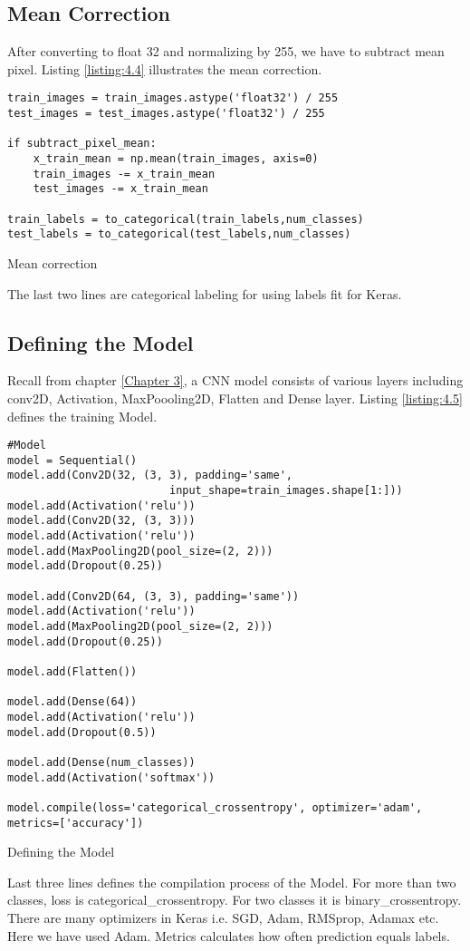 \subsection{Mean Correction}
After converting to float 32 and normalizing by 255, we have to subtract mean pixel.
Listing \ref{listing:4.4} illustrates the mean correction.

\begin{listing}[H]
    \begin{verbatim}
train_images = train_images.astype('float32') / 255
test_images = test_images.astype('float32') / 255

if subtract_pixel_mean:
    x_train_mean = np.mean(train_images, axis=0)
    train_images -= x_train_mean
    test_images -= x_train_mean

train_labels = to_categorical(train_labels,num_classes)
test_labels = to_categorical(test_labels,num_classes)
    \end{verbatim}
    \caption{Mean correction}
\label{listing:4.4}
\end{listing}
\noindent The last two lines are categorical labeling for using labels fit for Keras.
\subsection{Defining the Model}
Recall from chapter \ref{Chapter 3}, a CNN model consists of various layers including
conv2D, Activation, MaxPoooling2D, Flatten and Dense layer. Listing \ref{listing:4.5}
defines the training Model.

\begin{longlisting}
    \begin{verbatim}
#Model
model = Sequential()
model.add(Conv2D(32, (3, 3), padding='same',
                         input_shape=train_images.shape[1:]))
model.add(Activation('relu'))
model.add(Conv2D(32, (3, 3)))
model.add(Activation('relu'))
model.add(MaxPooling2D(pool_size=(2, 2)))
model.add(Dropout(0.25))   

model.add(Conv2D(64, (3, 3), padding='same'))
model.add(Activation('relu'))
model.add(MaxPooling2D(pool_size=(2, 2)))
model.add(Dropout(0.25)) 
     
model.add(Flatten())

model.add(Dense(64))
model.add(Activation('relu'))
model.add(Dropout(0.5)) 

model.add(Dense(num_classes))
model.add(Activation('softmax'))

model.compile(loss='categorical_crossentropy', optimizer='adam',
metrics=['accuracy'])
    \end{verbatim}
    \caption{Defining the Model}
\label{listing:4.5}
\end{longlisting}
Last three lines defines the compilation process of the Model. 
For more than two classes, loss is categorical\_crossentropy. For two
classes it is binary\_crossentropy. There are many optimizers in Keras i.e.
SGD, Adam, RMSprop, Adamax etc. Here we have used Adam. Metrics calculates how
often prediction equals labels.
